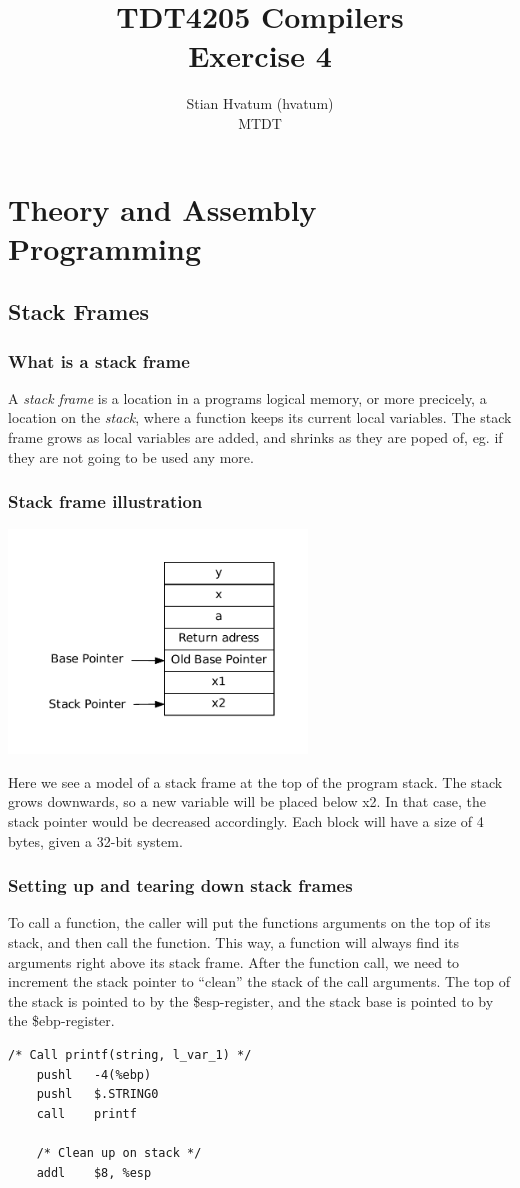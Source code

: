 \documentclass[english,a4paper]{scrartcl}
\title{TDT4205 Compilers\\
\Huge Exercise 4}
\author{Stian Hvatum (hvatum)\\MTDT}
\begin{document}
\maketitle
\tableofcontents
\section{Theory and Assembly Programming}
\subsection{Stack Frames}
\subsubsection{What is a stack frame}
A \emph{stack frame} is a location in a programs logical memory, or more
precicely, a location on the \emph{stack}, where a function keeps its current
local variables. The stack frame grows as local variables are added, and shrinks
as they are poped of, eg. if they are not going to be used any more.

\subsubsection{Stack frame illustration}
\centerline{\includegraphics[width=300px]{stackframe.pdf}}
Here we see a model of a stack frame at the top of the program stack. The stack
grows downwards, so a new variable will be placed below x2. In that case, the
stack pointer would be decreased accordingly. Each block will have a size
of 4 bytes, given a 32-bit system.

\subsubsection{Setting up and tearing down stack frames}
To call a function, the caller will put the functions arguments on the top of
its stack, and then call the function. This way, a function will always find its
arguments right above its stack frame. After the function call, we need to
increment the stack pointer to ``clean'' the stack of the call arguments. The
top of the stack is pointed to by the \$esp-register, and the stack base is
pointed to by the \$ebp-register.
\begin{lstlisting}[language={[x86masm]Assembler}]
	/* Call printf(string, l_var_1) */
	pushl   -4(%ebp)
	pushl   $.STRING0
	call    printf

	/* Clean up on stack */
	addl    $8, %esp
\end{lstlisting}
\end{document}
